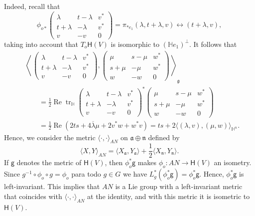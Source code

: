 \documentclass[12pt, a4paper]{amsart}
\newcommand{\g}{\mathfrak}
\newcommand{\tr}{\operatorname{tr}}
\renewcommand{\H}{\mathbb{H}}
\renewcommand{\Re}{\operatorname{Re}}
\theoremstyle{remark}
\begin{document}
Indeed, recall that 
\[
\phi_{o*}\left(
\begin{array}{cc|c}
	\lambda & t-\lambda & v^*\\
	t+\lambda & -\lambda & v^*\\
	\hline
	v & -v & 0
\end{array}
\right)
=\pi_{*e_1}(\lambda,t+\lambda,v)
\leftrightarrow (t+\lambda,v),
\]
taking into account that $T_o\mathsf{H}(V)$ is isomorphic to $(\H e_1)^\perp$.
It follows that
\[
\begin{aligned}
&\left\langle\,
\left(
\begin{array}{cc|c}
	\lambda & t-\lambda & v^*\\
	t+\lambda & -\lambda & v^*\\
	\hline
	v & -v & 0
\end{array}
\right),
\left(
\begin{array}{cc|c}
	\mu & s-\mu & w^*\\
	s+\mu & -\mu & w^*\\
	\hline
	w & -w & 0
\end{array}
\right)\,
\right\rangle_{\g{g}}\\
&{}\qquad=\frac{1}{2}\Re\tr_\H \left(
\begin{array}{cc|c}
	\lambda & t-\lambda & v^*\\
	t+\lambda & -\lambda & v^*\\
	\hline
	v & -v & 0
\end{array}
\right)^*
\left(
\begin{array}{cc|c}
	\mu & s-\mu & w^*\\
	s+\mu & -\mu & w^*\\
	\hline
	w & -w & 0
\end{array}
\right)\\
&{}\qquad=\frac{1}{2}\Re(2ts+4\overline{\lambda}\mu+2v^*w+w^*v)
=ts+2\langle (\lambda,v),(\mu,w)\rangle_{\H^n}.
\end{aligned}
\]
Hence, we consider the metric $\langle\cdot,\cdot \rangle_{AN}$ on $\g{a}\oplus\g{n}$ defined by
\[
\langle X,Y \rangle_{AN}
=\langle X_{\g{a}},Y_{\g{a}} \rangle+\frac{1}{2}\langle X_{\g{n}},Y_{\g{n}}\rangle.
\]
If $\mathsf{g}$ denotes the metric of $\mathsf{H}(V)$, then $\phi_o^*\mathsf{g}$ makes $\phi_o\colon AN\to \mathsf{H}(V)$ an isometry. 
Since $g^{-1}\circ\phi_o\circ g=\phi_o$ para todo $g\in G$ we have $L_g^*(\phi_o^*\mathsf{g})=\phi_o^*\mathsf{g}$.
Hence, $\phi_o^*\mathsf{g}$ is left-invariant.
This implies that $AN$ is a Lie group with a left-invariant metric that coincides with $\langle\cdot,\cdot \rangle_{AN}$ at the identity, and with this metric it is isometric to $\mathsf{H}(V)$.
\end{document}
